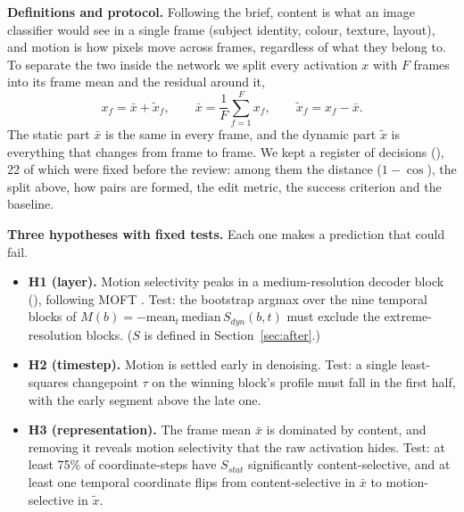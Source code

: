 \documentclass[twoside,english]{article}
\newcommand{\xs}{\bar{x}}         %
\newcommand{\xd}{\tilde{x}}       %
\begin{document}
\textbf{Definitions and protocol.} Following the brief, content is what an image classifier would see
in a single frame (subject identity, colour, texture, layout), and motion is how pixels move across
frames, regardless of what they belong to. To separate the two inside the network we split every
activation $x$ with $F$ frames into its frame mean and the residual around it,
\begin{equation}
x_f = \xs + \xd_f, \qquad \xs = \frac{1}{F}\sum_{f=1}^{F} x_f, \qquad \xd_f = x_f - \xs. \label{eq:split}
\end{equation}
The static part $\xs$ is the same in every frame, and the dynamic part $\xd$ is everything that
changes from frame to frame. We kept a register of decisions (), 22 of which
were fixed before the review: among them the distance ($1-\cos$), the split above, how pairs are
formed, the edit metric, the success criterion and the baseline.

\textbf{Three hypotheses with fixed tests.} Each one makes a prediction that could fail.
\begin{itemize}
\item \textbf{H1 (layer).} Motion selectivity peaks in a medium-resolution decoder block
  (), following MOFT \citep{xiao2024moft}. Test: the bootstrap argmax over the nine
  temporal blocks of $M(b) = -\mathrm{mean}_t\,\mathrm{median}\,S_{dyn}(b,t)$ must exclude the
  extreme-resolution blocks. ($S$ is defined in Section~\ref{sec:after}.)
\item \textbf{H2 (timestep).} Motion is settled early in denoising. Test: a single least-squares
  changepoint $\tau$ on the winning block's profile must fall in the first half, with the early
  segment above the late one.
\item \textbf{H3 (representation).} The frame mean $\xs$ is dominated by content, and removing it
  reveals motion selectivity that the raw activation hides. Test: at least 75\% of coordinate-steps
  have $S_{stat}$ significantly content-selective, and at least one temporal coordinate flips from
  content-selective in $\xs$ to motion-selective in $\xd$.
\end{itemize}
\end{document}
